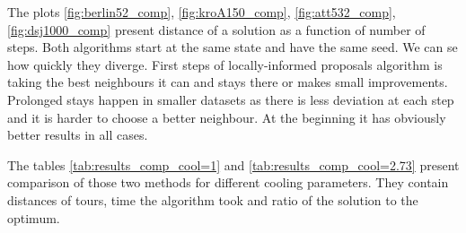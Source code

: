 	
	
	The plots \ref{fig:berlin52_comp}, \ref{fig:kroA150_comp}, \ref{fig:att532_comp}, \ref{fig:dsj1000_comp} present distance of a solution as a function of number of steps. Both algorithms start at the same state and have the same seed. We can se how quickly they diverge. First steps of locally-informed proposals algorithm is taking the best neighbours it can and stays there or makes small improvements. Prolonged stays happen in smaller datasets as there is less deviation at each step and it is harder to choose a better neighbour. At the beginning it has obviously better results in all cases. 
	
	
	
	The tables \ref{tab:results_comp_cool=1} and \ref{tab:results_comp_cool=2.73} present comparison of those two methods for different cooling parameters. They contain distances of tours, time the algorithm took and ratio of the solution to the optimum.